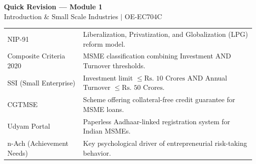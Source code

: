 \documentclass[12pt,a4paper]{article}
\renewcommand{\arraystretch}{1.45}
\begin{document}
\newpage

\begin{center}
  {\large\bfseries\color{myred} Quick Revision --- Module 1}\\[3pt]
  {\small\color{mydark} Introduction \& Small Scale Industries $|$ OE-EC704C}
\end{center}
\noindent{\color{myred}\rule{\linewidth}{1.2pt}}
\vspace{4pt}

\begin{tcolorbox}[formulabox, title={\textbf{Key Concepts at a Glance}}]
\renewcommand{\arraystretch}{1.3}
\begin{tabularx}{\linewidth}{B{4.0cm} X}
NIP-91 & Liberalization, Privatization, and Globalization (LPG) reform model. \\
Composite Criteria 2020 & MSME classification combining Investment AND Turnover thresholds. \\
SSI (Small Enterprise) & Investment limit $\le \text{Rs. } 10 \text{ Crores}$ AND Annual Turnover $\le \text{Rs. } 50 \text{ Crores}$. \\
CGTMSE & Scheme offering collateral-free credit guarantee for MSME loans. \\
Udyam Portal & Paperless Aadhaar-linked registration system for Indian MSMEs. \\
n-Ach (Achievement Needs) & Key psychological driver of entrepreneurial risk-taking behavior. \\
\end{tabularx}
\end{tcolorbox}
\end{document}
